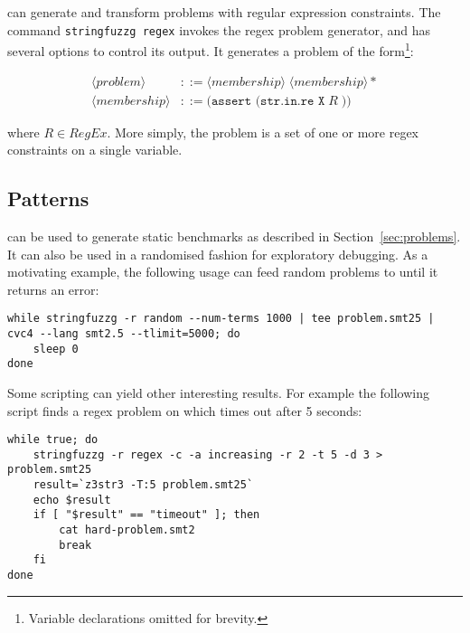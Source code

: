         \fuzzer{} can generate and transform problems with regular expression constraints. The command \texttt{stringfuzzg regex} invokes the regex problem generator, and has several options to control its output. It generates a problem of the form\footnote{Variable declarations omitted for brevity.}:

        \begin{align*}
            \langle problem \rangle  & ::= \langle membership \rangle \; \langle membership \rangle * \\
            \langle membership \rangle & ::= \texttt{(assert (str.in.re X}\; R\; \texttt{))}
        \end{align*}


        where $R \in RegEx$. More simply, the problem is a set of one or more regex constraints on a single variable.


    \subsection{Patterns}

        \fuzzer{} can be used to generate static benchmarks as described in Section~\ref{sec:problems}. It can also be used in a randomised fashion for exploratory debugging. As a motivating example, the following usage can feed random problems to \cvc{} until it returns an error:

        {\scriptsize\begin{verbatim}
while stringfuzzg -r random --num-terms 1000 | tee problem.smt25 | cvc4 --lang smt2.5 --tlimit=5000; do
    sleep 0
done\end{verbatim}}

        Some \unix{} scripting can yield other interesting results. For example the following script finds a regex problem on which \us{} times out after 5 seconds:

        {\scriptsize\begin{verbatim}while true; do
    stringfuzzg -r regex -c -a increasing -r 2 -t 5 -d 3 > problem.smt25
    result=`z3str3 -T:5 problem.smt25`
    echo $result
    if [ "$result" == "timeout" ]; then
        cat hard-problem.smt2
        break
    fi
done\end{verbatim}}
